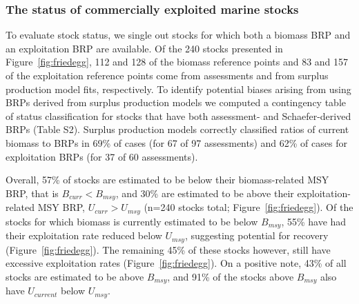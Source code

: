 
\subsubsection*{The status of commercially exploited marine stocks }
To evaluate stock status, we single out stocks for which both a biomass
BRP and an exploitation BRP are available. Of the
240 stocks presented in
Figure~\ref{fig:friedegg}, 112 and
128 of the biomass reference points and
83 and
157 of the exploitation reference
points come from assessments and from surplus production model fits,
respectively.  To identify potential biases arising from using BRPs
derived from surplus production models we computed a contingency table
of status classification for stocks that have both assessment- and
Schaefer-derived BRPs (Table S2). Surplus production models correctly
classified ratios of current biomass to BRPs in
69\% of cases (for 67
of 97 assessments) and 62\%
of cases for exploitation BRPs (for 37 of
60 assessments).



Overall, 57\% of stocks are estimated
to be below their biomass-related MSY BRP, that is $B_{curr}<B_{msy}$,
and 30\% are estimated to be above
their exploitation-related MSY BRP, $U_{curr}>U_{msy}$
(n=240 stocks total; Figure~\ref{fig:friedegg}).
Of the stocks for which biomass is currently estimated to be below
$B_{msy}$, 55\% have had their
exploitation rate reduced below $U_{msy}$, suggesting potential for
recovery (Figure~\ref{fig:friedegg}). The remaining
45\% of these stocks however,
still have excessive exploitation rates (Figure~\ref{fig:friedegg}).
On a positive note, 43\% of all stocks are
estimated to be above $B_{msy}$, and
91\% of the stocks above
$B_{msy}$ also have $U_{current}$ below $U_{msy}$.




